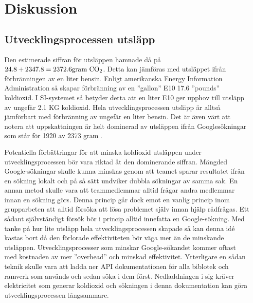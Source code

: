 
\section{Diskussion}
\label{sec:joel_a-discussion}

\subsection{Utvecklingsprocessen utsläpp}
Den estimerade siffran för utsläppen hamnade då på $24.8 + 2347.8 = 2372.6 \text{gram \ce{CO2}}$. Detta kan jämföras med utsläppet ifrån förbränningen av en liter bensin. Enligt amerikanska Energy Information Administration så skapar förbränning av en ''gallon'' E10 17.6 ''pounds'' koldioxid.\cite{co2-bensin} I SI-systemet så betyder detta att en liter E10 ger upphov till utsläpp av ungefär 2.1 KG koldioxid. Hela utvecklingsprocessen  utsläpp är alltså jämförbart med förbränning av ungefär en liter bensin. Det är även värt att notera att uppskattningen är helt dominerad av utsläppen ifrån Googlesökningar som står för 1920 av 2373 gram . 

Potentiella förbättringar för att minska koldioxid utsläppen under utvecklingsprocessen bör vara riktad åt den dominerande siffran. Mängded Google-sökningar skulle kunna minskas genom att teamet sparar resultatet ifrån en sökning lokalt och på så sätt undviker dubbla sökningar av samma sak. En annan metod skulle vara att teammedlemmar alltid frågar andra medlemmar innan en sökning görs. Denna princip går dock emot en vanlig princip inom grupparbeten att alltid försöka att lösa problemet själv innan hjälp rådfrågas. Ett sådant självständigt försök bör i princip alltid innefatta en Google-sökning. Med tanke på hur lite utsläpp hela utvecklingsprocessen skapade så kan denna idé kastas bort då den förlorade effektiviteten bör väga mer än de minskande utsläppen. Utvecklingsprocesser som minskar Google-sökandet kommer oftast med kostnaden av mer ''overhead'' och minskad effektivitet. Ytterligare en sådan teknik skulle vara att ladda ner API dokumentationen för alla biblotek och ramverk som används och sedan söka i dem först. Nedladdningen i sig kräver elektricitet som generar koldioxid och sökningen i denna dokumentation kan göra utvecklingsprocessen långsammare.


